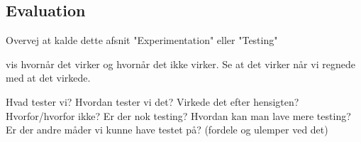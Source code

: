 
\subsection{Evaluation}

Overvej at kalde dette afsnit "Experimentation" eller "Testing"

vis hvornår det virker og hvornår det ikke virker. 
Se at det virker når vi regnede med at det virkede.

Hvad tester vi?
Hvordan tester vi det?
Virkede det efter hensigten?
Hvorfor/hvorfor ikke?
Er der nok testing?
Hvordan kan man lave mere testing?
Er der andre måder vi kunne have testet på? (fordele og ulemper ved det)
